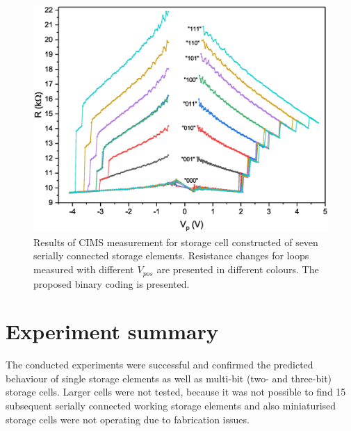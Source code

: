     \begin{figure}[H]
        \centering
        \includegraphics[width=0.7\paperwidth]{img/05/ResultsCIMS3.eps}
        \caption{Results of CIMS measurement for storage cell constructed of seven serially connected storage elements. Resistance changes for loops measured with different $V_{pos}$ are presented in different colours. The proposed binary coding is presented.}
        \label{ExperimentMeasurementCIMS3}
    \end{figure}

\section{Experiment summary} \label{sec:ExperimentSummary}

    The conducted experiments were successful and confirmed the predicted behaviour of single storage elements as well as multi-bit (two- and three-bit) storage cells. Larger cells were not tested, because it was not possible to find 15 subsequent serially connected working storage elements and also miniaturised storage cells were not operating due to fabrication issues.